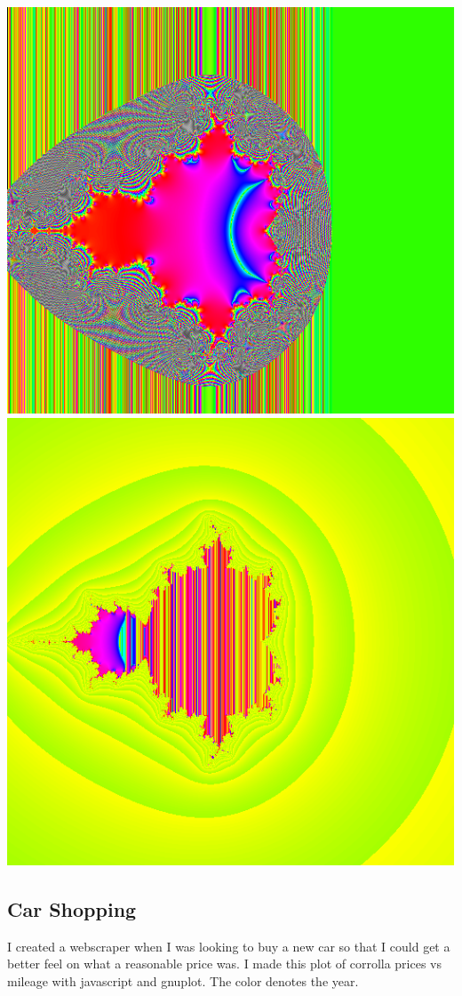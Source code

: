 \documentclass[../r.tex]{subfiles}
\begin{document}
\includegraphics[scale=0.15]{../TAing/mandel/ummmm.png}
\includegraphics[scale=0.15]{../TAing/mandel/What.png}

\newpage
\subsection{Car Shopping}
I created a webscraper when I was looking to buy a new car so that I could get a better feel on what a reasonable price was.  I made this plot of corrolla prices vs mileage with javascript and gnuplot.  The color denotes the year.
\end{document}
